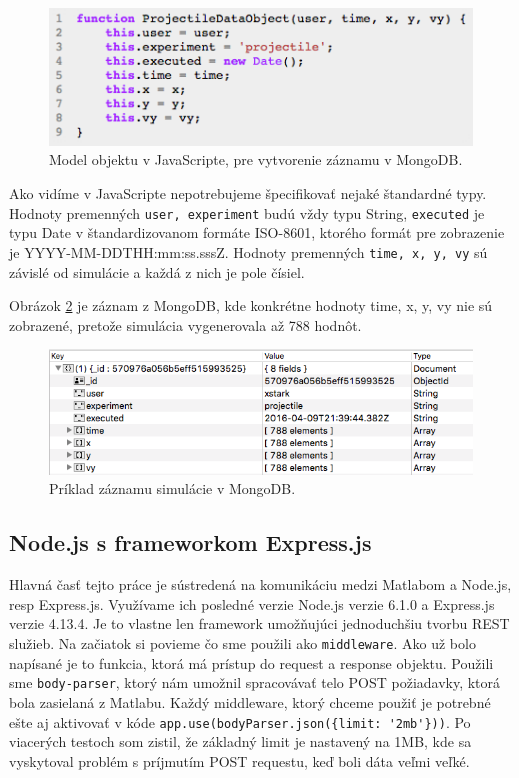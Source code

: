 \begin{figure}[H]
  \centering
  \includegraphics[scale=0.8]{img/code/javascript-projectile-model.png}
  \caption{Model objektu v JavaScripte, pre vytvorenie záznamu v MongoDB.}
  \label{img-js-projectile-model}
\end{figure}

Ako vidíme v JavaScripte nepotrebujeme špecifikovať nejaké štandardné typy. Hodnoty premenných \verb|user, experiment| budú vždy typu String, \verb|executed| je typu Date v štandardizovanom formáte ISO-8601, ktorého formát pre zobrazenie je YYYY-MM-DDTHH:mm:ss.sssZ. Hodnoty premenných \verb|time, x, y, vy| sú závislé od simulácie a každá z nich je pole čísiel.

Obrázok \ref{img-mongo-record} je záznam z MongoDB, kde konkrétne hodnoty time, x, y, vy nie sú zobrazené, pretože simulácia vygenerovala až 788 hodnôt.

\begin{figure}[H]
  \centering
  \includegraphics[scale=0.7]{img/code/mongodb-record.png}
  \caption{Príklad záznamu simulácie v MongoDB.}
  \label{img-mongo-record}
\end{figure}


\subsection{Node.js s frameworkom Express.js}
Hlavná časť tejto práce je sústredená na komunikáciu medzi Matlabom a Node.js, resp Express.js. Využívame ich posledné verzie Node.js verzie 6.1.0 a Express.js verzie 4.13.4. Je to vlastne len framework umožňujúci jednoduchšiu tvorbu REST služieb. Na začiatok si povieme čo sme použili ako \verb|middleware|. Ako už bolo napísané je to funkcia, ktorá má prístup do request a response objektu. Použili sme \verb|body-parser|, ktorý nám umožnil spracovávať telo POST požiadavky, ktorá bola zasielaná z Matlabu. Každý middleware, ktorý chceme použiť je potrebné ešte aj aktivovať v kóde \verb|app.use(bodyParser.json({limit: '2mb'}))|. Po viacerých testoch som zistil, že základný limit je nastavený na 1MB, kde sa vyskytoval problém s príjmutím POST requestu, keď boli dáta veľmi veľké.

